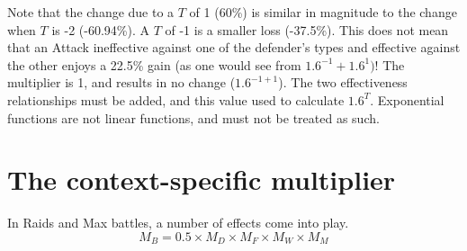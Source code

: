 Note that the change due to a $T$ of 1 (60\%) is similar in magnitude to the change
 when $T$ is -2 (-60.94\%). A $T$ of -1 is a smaller loss (-37.5\%).
This does not mean that an Attack ineffective against one of the defender's types and
 effective against the other enjoys a 22.5\% gain (as one would see from $1.6^{-1} + 1.6^{1})$!
The multiplier is 1, and results in no change ($1.6^{-1+1}$).
The two effectiveness relationships must be added, and this value used to
 calculate $1.6^T$.
Exponential functions are not linear functions, and must not be treated as such.

\section{The context-specific multiplier}
\label{sec:mbmult}
In Raids and Max battles, a number of effects come into play.
\[ M_B = 0.5 \times M_D \times M_F \times M_W \times M_M \]
